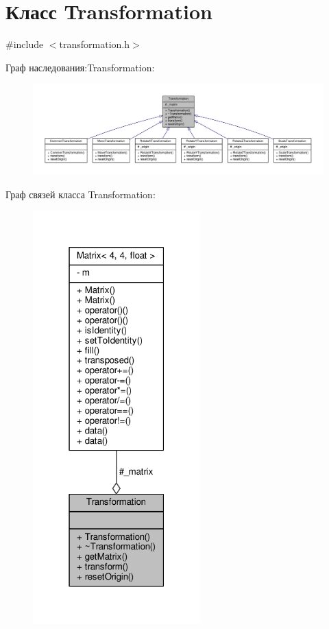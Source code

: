 \hypertarget{class_transformation}{}\section{Класс Transformation}
\label{class_transformation}


{\ttfamily \#include $<$transformation.\+h$>$}



Граф наследования\+:Transformation\+:
\nopagebreak
\begin{figure}[H]
\begin{center}
\leavevmode
\includegraphics[width=350pt]{d5/deb/class_transformation__inherit__graph}
\end{center}
\end{figure}


Граф связей класса Transformation\+:
\nopagebreak
\begin{figure}[H]
\begin{center}
\leavevmode
\includegraphics[width=183pt]{df/dce/class_transformation__coll__graph}
\end{center}
\end{figure}
